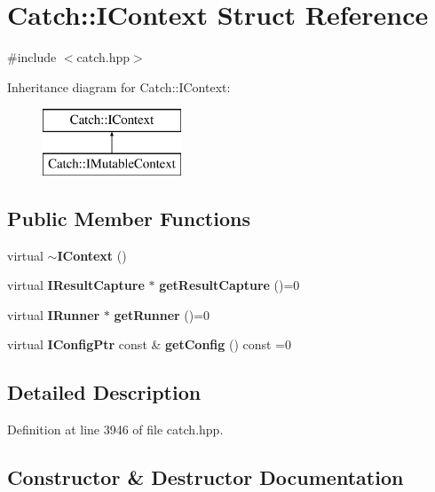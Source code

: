 \section{Catch\+::I\+Context Struct Reference}
\label{struct_catch_1_1_i_context}


{\ttfamily \#include $<$catch.\+hpp$>$}

Inheritance diagram for Catch\+::I\+Context\+:\begin{figure}[H]
\begin{center}
\leavevmode
\includegraphics[height=2.000000cm]{struct_catch_1_1_i_context}
\end{center}
\end{figure}
\subsection*{Public Member Functions}
\begin{DoxyCompactItemize}
\item 
virtual \textbf{ $\sim$\+I\+Context} ()
\item 
virtual \textbf{ I\+Result\+Capture} $\ast$ \textbf{ get\+Result\+Capture} ()=0
\item 
virtual \textbf{ I\+Runner} $\ast$ \textbf{ get\+Runner} ()=0
\item 
virtual \textbf{ I\+Config\+Ptr} const  \& \textbf{ get\+Config} () const =0
\end{DoxyCompactItemize}


\subsection{Detailed Description}


Definition at line 3946 of file catch.\+hpp.



\subsection{Constructor \& Destructor Documentation}
\mbox{\label{struct_catch_1_1_i_context_aeb17355c1be6c2ced5407cad7202628d}} 
